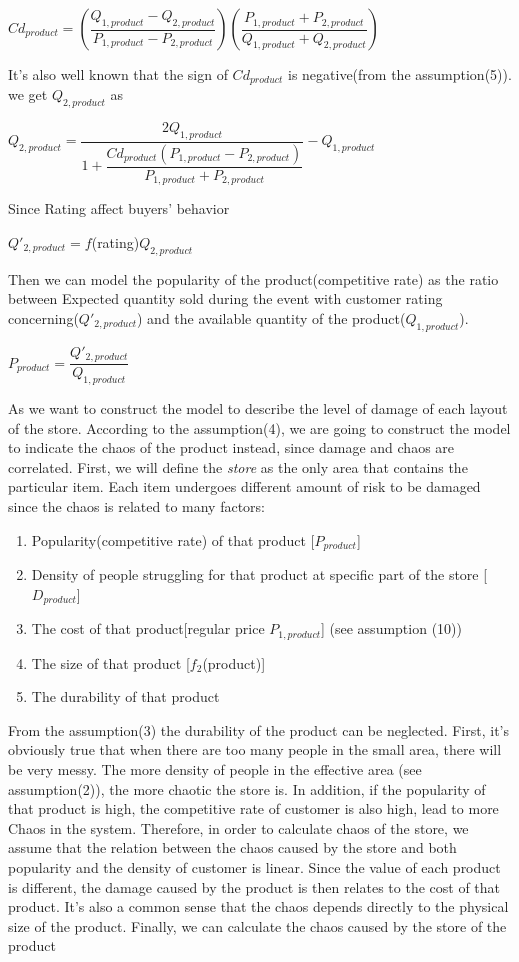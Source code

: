\begin{center}
    $Cd_{product}=(\dfrac{Q_{1,product}-Q_{2,product}}{P_{1,product}-P_{2,product}})(\dfrac{P_{1,product}+P_{2,product}}{Q_{1,product}+Q_{2,product}})$
\end{center}
It's also well known that the sign of $Cd_{product}$ is negative(from the assumption(5)). we get $Q_{2,product}$ as 
\begin{center}
    $Q_{2,product}=\dfrac{2Q_{1,product}}{1+\dfrac{Cd_{product}(P_{1,product}-P_{2,product})}{P_{1,product}+P_{2,product}}}-Q_{1,product}$
\end{center}

Since Rating affect buyers’ behavior
\begin{center}
    $Q'_{2,product}=f$(rating)$Q_{2,product}$
\end{center}
Then we can model the popularity of the product(competitive rate) as the ratio between Expected quantity sold during the event with customer rating concerning($Q'_{2,product}$) and the available quantity of the product($Q_{1,product}$).
\begin{model}
    $P_{product}=\dfrac{Q'_{2,product}}{Q_{1,product}}$
\end{model}


As we want to construct the model to describe the level of damage of each layout of the store. According to the assumption(4), we are going to construct the model to indicate the chaos of the product instead, since damage and chaos are correlated. First, we will define the \emph{store} as the only area that contains the particular item. Each item undergoes different amount of risk to be damaged since the chaos is related to many factors: 
\begin{enumerate}
    \item Popularity(competitive rate) of that product [$P_{product}$]
    \item Density of people struggling for that product at specific part of the store [$D_{product}$]
    \item The cost of that product[regular price $P_{1,product}$] (see assumption (10))
    \item The size of that product [$f_2$(product)]
    \item The durability of that product
\end{enumerate}
From the assumption(3) the durability of the product can be neglected. First, it's obviously true that when there are too many people in the small area, there will be very messy. The more density of people in the effective area (see assumption(2)), the more chaotic the store is. In addition, if the popularity of that product is high, the competitive rate of customer is also high, lead to more Chaos in the system. Therefore, in order to calculate chaos of the store, we assume that the relation between the chaos caused by the store and both popularity and the density of customer is linear. Since the value of each product is different, the damage caused by the product is then relates to the cost of that product. It's also a common sense that the chaos depends directly to the physical size of the product. Finally, we can calculate the chaos caused by the store of the product

